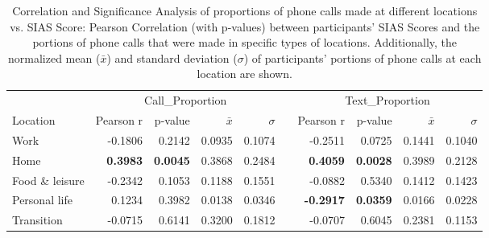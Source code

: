 \begin{table}[b]
\caption{Correlation and Significance Analysis of proportions of phone calls made at different locations vs. SIAS Score: Pearson Correlation (with p-values) between participants' SIAS Scores and the portions of phone calls that were made in specific types of locations.  Additionally, the normalized mean  ($\bar{x}$) and standard deviation ($\sigma$) of participants' portions of phone calls at each location are shown.\label{tab:pearson_call_text}}
% 
% 
\begin{center}
\small
\def\arraystretch{1.5}
	\begin{tabular}{ l @{\hskip 0.5in} r r r r r r r r r }
    \toprule   %
                  				& \multicolumn{4}{c}{Call\_Proportion} 														&	& \multicolumn{4}{c}{Text\_Proportion} \\
        \cline{2-5} \cline{7-10}                        
    	Location 				& Pearson r 		& p-value 			& $\bar{x}$ 		& $\sigma$ 			&	& Pearson r 		& p-value 			& $\bar{x}$ 		& $\sigma$ 	\\
		\hline
        Work 					& -0.1806			& 0.2142  			& 0.0935			& 0.1074			&	& -0.2511			& 0.0725			& 0.1441 			& 0.1040  			\\
        Home 			& \textbf{0.3983} 	& \textbf{0.0045} 	& 0.3868 	& 0.2484	&	& \textbf{0.4059}	& \textbf{0.0028}	& 0.3989	& 0.2128	\\
        {Food \& leisure} 		& -0.2342 			& 0.1053 			& 0.1188 			& 0.1551			&	& -0.0882			& 0.5340			& 0.1412			& 0.1423 			\\
        Personal life 			&	0.1234 			& 0.3982 			& 0.0138 			& 0.0346			&	& \textbf{-0.2917}			& \textbf{0.0359}			& 0.0166			& 0.0228 			\\
        Transition 				& -0.0715 			& 0.6141 			& 0.3200 			& 0.1812			&	& -0.0707			& 0.6045			& 0.2381			& 0.1153 			\\
        \bottomrule
  	\end{tabular}
\end{center}
\end{table}









